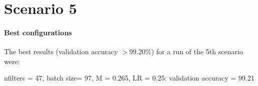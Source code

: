 \documentclass{article}
\begin{document}
    
\section*{Scenario 5}
    
    
    \paragraph{Best configurations}
        The best results (validation accuracy $> 99.20\%$) for a run of the 5th scenario were:
        
        nfilters = 47, batch size= 97, M = 0.265, LR = 0.25: validation accuracy = 99.21
        
    
\end{document}
